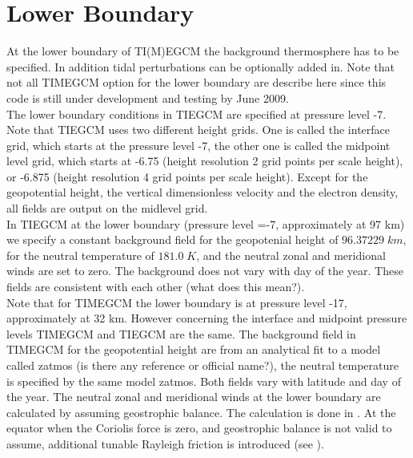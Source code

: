 \section{Lower Boundary}
%
At the lower boundary of TI(M)EGCM the background thermosphere has to be specified.
In addition tidal perturbations can be optionally added in. Note that not all TIMEGCM option for the lower
boundary are describe here since this code is still under development and testing by June 2009.\\

%
The lower boundary conditions in TIEGCM are specified at pressure level 
-7. Note that TIEGCM uses two different height grids. One is called the
interface grid, which starts at the pressure level -7, the other one is called the
midpoint level grid, which starts at -6.75 (height resolution 2 grid points per
scale height), or -6.875 (height resolution 4 grid points per
scale height). Except for the geopotential height, the vertical dimensionless
velocity and the electron density, all fields are output on the midlevel grid. \\

In TIEGCM at the lower boundary (pressure level =-7, approximately at 97 km) we specify a 
constant background 
field for the geopotenial height of $96.37229 \;  km$,
for the neutral temperature of $181.0 \; K$, and the neutral zonal and meridional 
winds are set to zero. The background does not vary with day of the year.
These fields are consistent with each other (what does
this mean?). \\

Note that for TIMEGCM the lower boundary is at pressure level -17, 
approximately at 32 km. However concerning the interface and midpoint 
pressure levels TIMEGCM and TIEGCM are the same. The background field in TIMEGCM
for the geopotential height are from an analytical fit to a model called zatmos
(is there any reference or official name?), the neutral temperature is specified by
the same model zatmos. Both fields vary with latitude and day of the year. 
The neutral zonal and meridional winds at the lower
boundary are calculated by assuming geostrophic balance. The calculation is done in
 . At the equator when the Coriolis force
is zero, and geostrophic balance is not valid to assume, additional 
tunable Rayleigh friction is introduced (see ). \\

